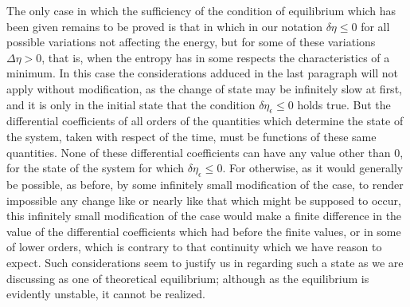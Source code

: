 \documentclass[12pt]{memoir}
\begin{document}
The only case in which the sufficiency of the condition of equilibrium which has been given remains to be proved is that in which in our notation $\delta \eta \leq 0$ for all possible variations not affecting the energy, but for some of these variations $\Delta \eta >0$, that is, when the entropy has in some respects the characteristics of a minimum. In this case the considerations adduced in the last paragraph will not apply without modification, as the change of state may be infinitely slow at first, and it is only in the initial state that the condition $\delta \eta_\epsilon \leq 0$ holds true. But the differential coefficients of all orders of the quantities which determine the state of the system, taken with respect of the time, must be functions of these same quantities. None of these differential coefficients can have any value other than 0, for the state of the system for which $\delta \eta_\epsilon \leq 0$. For otherwise, as it would generally be possible, as before, by some infinitely small modification of the case, to render impossible any change like or nearly like that which might be supposed to occur, this infinitely small modification of the case would make a finite difference in the value of the differential coefficients which had before the finite values, or in some of lower orders, which is contrary to that continuity which we have reason to expect. Such considerations seem to justify us in regarding such a state as we are discussing as one of theoretical equilibrium; although as the equilibrium is evidently unstable, it cannot be realized.
\end{document}
